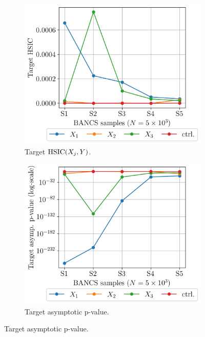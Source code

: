 \begin{figure}
    \centering
    \begin{subfigure}[b]{0.48\linewidth}
        \centering
        \includegraphics[width=\linewidth]{part3/figures/BANCS/ishigami_THSIC.png}
        \caption{Target $\mathrm{HSIC}(X_j, Y)$.}
    \end{subfigure}
    \begin{subfigure}[b]{0.48\linewidth}
        \centering
        \includegraphics[width=\linewidth]{part3/figures/BANCS/ishigami_Tpvalue_asymptotic.png}
        \caption{Target asymptotic p-value.}
    \end{subfigure}

\end{figure}
